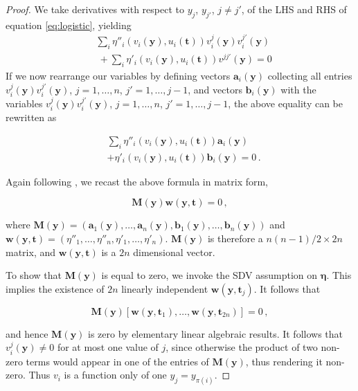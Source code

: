 \begin{proof}
	We take derivatives with respect to $y_j$, $y_{j'}$, $j \neq j'$,  of the LHS and RHS of equation \ref{eq:logistic}, yielding
	\begin{align*}
	&\sum_{i} \eta''_{i}(v_{i}(\bm{y}),u_{i}(\bm{t}))v^j_i(\bm{y})v^{j'}_i(\bm{y}) \\
	&\ + \sum_{i}\eta'_{i}(v_{i}(\bm{y}), u_{i}(\bm{t}))v^{jj'}(\bm{y})=0
	\end{align*}
	If we now rearrange our variables by defining vectors $\bm{a}_i(\bm{y})$ collecting all entries $v_i^j(\bm{y})v_i^{j'}(\bm{y})$, $j=1, \ldots, n$, $j'=1, \ldots, j-1$, and vectors $\bm{b}_i(\bm{y})$ with the variables $v_i^j(\bm{y})v_i^{j'}(\bm{y})$, $j=1, \ldots, n$, $j'=1, \ldots, j-1$, the above equality can be rewritten as
	
	\begin{align*}
	&\sum_{i} \eta''_{i}(v_{i}(\bm{y}),u_{i}(\bm{t}))\bm{a}_i(\bm{y}) \\
	&+ \eta'_{i}(v_{i}(\bm{y}), u_{i}(\bm{t}))\bm{b}_i(\bm{y})=0\,.
	\end{align*}
	
	Again following \cite{hyvarinen19a}, we recast the above formula in matrix form,
	
	\begin{equation}
	\label{eq:matrixmult}
	\bm{M}(\bm{y})\bm{w}(\bm{y}, \bm{t})=0\,,
	\end{equation}
	
	where $\bm{M}(\bm{y}) = (\bm{a}_1(\bm{y}), \ldots,  \bm{a}_n(\bm{y}), \bm{b}_1(\bm{y}), \ldots, \bm{b}_n(\bm{y})) $ and $\bm{w}(\bm{y}, \bm{t}) = (\eta''_{1}, \ldots, \eta''_{n}, \eta'_{1}, \ldots,\eta'_{n})$. $\bm{M}(\bm{y})$ is therefore a $n(n-1)/2 \times 2n$ matrix, and $\bm{w}(\bm{y}, \bm{t})$ is a $2n$ dimensional vector.
	
	To show that $\bm{M}(\bm{y})$ is equal to zero, we invoke the SDV assumption on $\bm{\eta}$.
	This implies the existence of $2n$ linearly independent $\bm{w}(\bm{y}, \bm{t}_j)$.
	It follows that
	
	\[
	\bm{M}(\bm{y})[\bm{w}(\bm{y}, \bm{t}_1), \ldots, \bm{w}(\bm{y}, \bm{t}_{2n})]=0\,,
	\]
	
	and hence $\bm{M}(\bm{y})$ is zero by elementary linear algebraic results.
	It follows that $v_i^j(\bm{y})\not=0$ for at most one value of $j$, since otherwise the product of two non-zero terms would appear in one of the entries of $\bm{M}(\bm{y})$, thus rendering it non-zero.
	Thus $v_i$ is a function only of one $y_j = y_{\pi(i)}$.
	

\end{proof}
